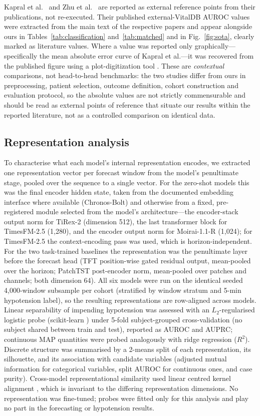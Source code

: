\documentclass[11pt]{article}
\begin{document}
Kapral et al.\ \citep{Kapral2024} and Zhu et al.\ \citep{Zhu2026} are
reported as external reference points from their publications, not
re-executed. Their published external-VitalDB AUROC values were extracted
from the main text of the respective papers and appear alongside ours in
Tables~\ref{tab:classification} and~\ref{tab:matched} and in
Fig.~\ref{fig:sota}, clearly marked as literature values. Where a value was
reported only graphically---specifically the mean absolute error curve of
Kapral et al.---it was recovered from the published figure using a
plot-digitization tool \citep{WebPlotDigitizer}. These are
\emph{contextual} comparisons, not head-to-head benchmarks: the two studies
differ from ours in preprocessing, patient selection, outcome definition,
cohort construction and evaluation protocol, so the absolute values are not
strictly commensurable and should be read as external points of reference
that situate our results within the reported literature, not as a controlled
comparison on identical data.

\subsection{Representation analysis}

To characterise what each model's internal representation encodes, we extracted
one representation vector per forecast window from the model's penultimate stage,
pooled over the sequence to a single vector. For the zero-shot models this was
the final encoder hidden state, taken from the documented embedding interface
where available (Chronos-Bolt) and otherwise from a fixed, pre-registered module
selected from the model's architecture---the encoder-stack output norm for
TiRex-2 (dimension 512), the last transformer block for TimesFM-2.5 (1{,}280),
and the encoder output norm for Moirai-1.1-R (1{,}024); for TimesFM-2.5 the
context-encoding pass was used, which is horizon-independent. For the two
task-trained baselines the representation was the penultimate layer before the
forecast head (TFT position-wise gated residual output, mean-pooled over the
horizon; PatchTST post-encoder norm, mean-pooled over patches and channels; both
dimension 64). All six models were run on the identical seeded 4{,}000-window
subsample per cohort (stratified by window stratum and 5-min hypotension label),
so the resulting representations are row-aligned across models. Linear
separability of impending hypotension was assessed with an $L_2$-regularised
logistic probe (scikit-learn \citep{Pedregosa2011}) under 5-fold subject-grouped cross-validation (no subject shared
between train and test), reported as AUROC and AUPRC; continuous MAP quantities
were probed analogously with ridge regression ($R^2$). Discrete structure was
summarised by a 2-means split of each representation, its silhouette, and its
association with candidate variables (adjusted mutual information for categorical
variables, split AUROC for continuous ones, and case purity). Cross-model
representational similarity used linear centred kernel alignment
\citep{Kornblith2019}, which is invariant to the differing representation
dimensions. No representation was fine-tuned; probes were fitted only for this
analysis and play no part in the forecasting or hypotension results.
\end{document}
